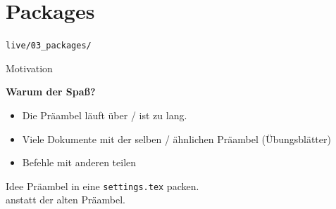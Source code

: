 \documentclass[14pt,aspectratio=169]{beamer}
\begin{document}


\section{Packages}
\begin{frame}
    \sectionpage
    \vspace{.5em}
    \large \faFolderOpen \texttt{live/03_packages/}   
\end{frame}


\begin{frame}{\insertsection \quad\small Motivation}
	
	\textbf{Warum der Spaß?}
	
    \begin{itemize}
        \item Die Präambel läuft über / ist zu lang.
        \item Viele Dokumente mit der selben / ähnlichen Präambel (Übungsblätter)
        \item Befehle mit anderen teilen
    \end{itemize}
    
    \pause
    
    \begin{exampleblock}{Idee}
    	Präambel in eine \texttt{settings.tex} packen. \\
    	\texttt{} anstatt der alten Präambel.
    \end{exampleblock}
\end{frame}
\end{document}
